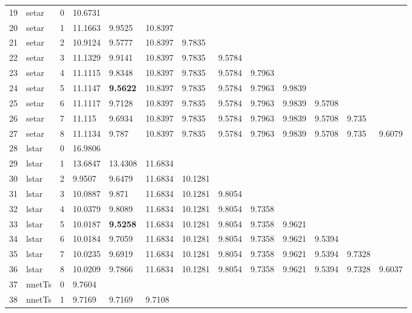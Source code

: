 \documentclass[10pt,a4paper]{article}
\begin{document}
\begin{table}[ht]
\begin{tabular}{rlrllllllllll}
   \hline
19 & setar &     0 & 10.6731 &  &  &  &  &  &  &  &  &  \\ 
  20 & setar &     1 & 11.1663 & 9.9525 & 10.8397 &  &  &  &  &  &  &  \\ 
  21 & setar &     2 & 10.9124 & 9.5777 & 10.8397 & 9.7835 &  &  &  &  &  &  \\ 
  22 & setar &     3 & 11.1329 & 9.9141 & 10.8397 & 9.7835 & 9.5784 &  &  &  &  &  \\ 
  23 & setar &     4 & 11.1115 & 9.8348 & 10.8397 & 9.7835 & 9.5784 & 9.7963 &  &  &  &  \\ 
  24 & setar &     5 & 11.1147 & \textbf{9.5622} & 10.8397 & 9.7835 & 9.5784 & 9.7963 & 9.9839 &  &  &  \\ 
  25 & setar &     6 & 11.1117 & 9.7128 & 10.8397 & 9.7835 & 9.5784 & 9.7963 & 9.9839 & 9.5708 &  &  \\ 
  26 & setar &     7 & 11.115 & 9.6934 & 10.8397 & 9.7835 & 9.5784 & 9.7963 & 9.9839 & 9.5708 & 9.735 &  \\ 
  27 & setar &     8 & 11.1134 & 9.787 & 10.8397 & 9.7835 & 9.5784 & 9.7963 & 9.9839 & 9.5708 & 9.735 & 9.6079 \\ 
   \hline
28 & lstar &     0 & 16.9806 &  &  &  &  &  &  &  &  &  \\ 
  29 & lstar &     1 & 13.6847 & 13.4308 & 11.6834 &  &  &  &  &  &  &  \\ 
  30 & lstar &     2 & 9.9507 & 9.6479 & 11.6834 & 10.1281 &  &  &  &  &  &  \\ 
  31 & lstar &     3 & 10.0887 & 9.871 & 11.6834 & 10.1281 & 9.8054 &  &  &  &  &  \\ 
  32 & lstar &     4 & 10.0379 & 9.8089 & 11.6834 & 10.1281 & 9.8054 & 9.7358 &  &  &  &  \\ 
  33 & lstar &     5 & 10.0187 & \textbf{9.5258} & 11.6834 & 10.1281 & 9.8054 & 9.7358 & 9.9621 &  &  &  \\ 
  34 & lstar &     6 & 10.0184 & 9.7059 & 11.6834 & 10.1281 & 9.8054 & 9.7358 & 9.9621 & 9.5394 &  &  \\ 
  35 & lstar &     7 & 10.0235 & 9.6919 & 11.6834 & 10.1281 & 9.8054 & 9.7358 & 9.9621 & 9.5394 & 9.7328 &  \\ 
  36 & lstar &     8 & 10.0209 & 9.7866 & 11.6834 & 10.1281 & 9.8054 & 9.7358 & 9.9621 & 9.5394 & 9.7328 & 9.6037 \\ 
   \hline
37 & nnetTs &     0 & 9.7604 &  &  &  &  &  &  &  &  &  \\ 
  38 & nnetTs &     1 & 9.7169 & 9.7169 & 9.7108 &  &  &  &  &  &  &  \\ 

\end{tabular}
\end{table}
\end{document}
